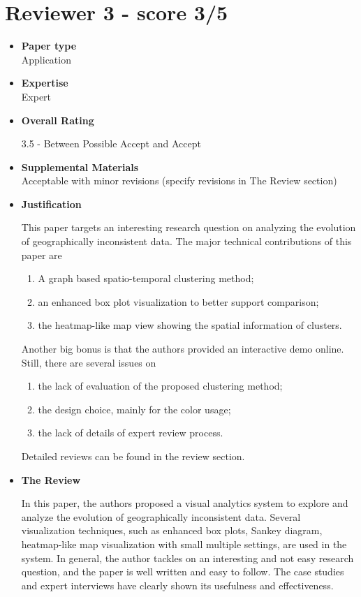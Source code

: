\documentclass{article}
\begin{document}
\section{Reviewer 3 - score 3/5}
\begin{itemize}

\item{\textbf{Paper type}\\Application}

\item{\textbf{Expertise}\\Expert}

\item{\textbf{Overall Rating}

    3.5 - Between Possible Accept and Accept}

\item{\textbf{Supplemental Materials}\\Acceptable with minor revisions (specify
revisions in The Review section)}

\item{\textbf{Justification}

    This paper targets an interesting research question on analyzing the evolution of
    geographically inconsistent data. The major technical contributions of this paper
    are
    \begin{enumerate} 
        \item{A graph based spatio-temporal clustering method;}
        \item{an enhanced box plot visualization to better support comparison;}
        \item{the heatmap-like map view showing the spatial information of clusters.}
    \end{enumerate}
    \noindent Another big bonus is that the authors provided an interactive demo
    online. Still, there are several issues on 
    \begin{enumerate} 
        \item{the lack of evaluation of the proposed clustering method;} 
        \item{the design choice, mainly for the color usage;}
        \item{the lack of details of expert review process.}
    \end{enumerate}
    \noindent Detailed reviews can be found in the review section.}

\item{\textbf{The Review}

    In this paper, the authors proposed a visual analytics system to explore and
    analyze the evolution of geographically inconsistent data. Several visualization
    techniques, such as enhanced box plots, Sankey diagram, heatmap-like map
    visualization with small multiple settings, are used in the system. In general,
    the author tackles on an interesting and not easy research question, and the paper
    is well written and easy to follow. The case studies and expert interviews have
    clearly shown its usefulness and effectiveness.

}
\end{itemize}
\end{document}
